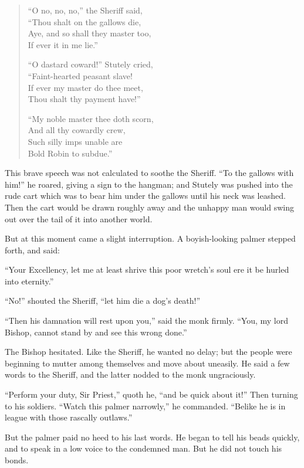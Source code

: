 \begin{quote}
``O no, no, no,'' the Sheriff said,\\
``Thou shalt on the gallows die,\\
Aye, and so shall they master too,\\
If ever it in me lie.''

``O dastard coward!'' Stutely cried,\\
``Faint-hearted peasant slave!\\
If ever my master do thee meet,\\
Thou shalt thy payment have!''

``My noble master thee doth scorn,\\
And all thy cowardly crew,\\
Such silly imps unable are\\
Bold Robin to subdue.''
\end{quote}

This brave speech was not calculated to soothe the Sheriff. ``To the
gallows with him!'' he roared, giving a sign to the hangman; and Stutely
was pushed into the rude cart which was to bear him under the gallows
until his neck was leashed. Then the cart would be drawn roughly away
and the unhappy man would swing out over the tail of it into another
world.

But at this moment came a slight interruption. A boyish-looking palmer
stepped forth, and said:

``Your Excellency, let me at least shrive this poor wretch's soul ere it
be hurled into eternity.''

``No!'' shouted the Sheriff, ``let him die a dog's death!''

``Then his damnation will rest upon you,'' said the monk firmly. ``You,
my lord Bishop, cannot stand by and see this wrong done.''

The Bishop hesitated. Like the Sheriff, he wanted no delay; but the
people were beginning to mutter among themselves and move about
uneasily. He said a few words to the Sheriff, and the latter nodded to
the monk ungraciously.

``Perform your duty, Sir Priest,'' quoth he, ``and be quick about it!''
Then turning to his soldiers. ``Watch this palmer narrowly,'' he
commanded. ``Belike he is in league with those rascally outlaws.''

But the palmer paid no heed to his last words. He began to tell his
beads quickly, and to speak in a low voice to the condemned man. But he
did not touch his bonds.

